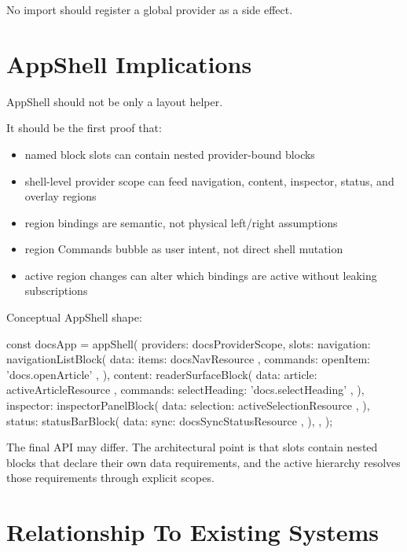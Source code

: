 No import should register a global provider as a side effect.

\section{AppShell Implications}\label{record-132-appshell-implications}

AppShell should not be only a layout helper.

It should be the first proof that:

\begin{itemize}
\tightlist
\item
  named block slots can contain nested provider-bound blocks
\item
  shell-level provider scope can feed navigation, content, inspector, status, and overlay regions
\item
  region bindings are semantic, not physical left/right assumptions
\item
  region Commands bubble as user intent, not direct shell mutation
\item
  active region changes can alter which bindings are active without leaking subscriptions
\end{itemize}

Conceptual AppShell shape:

\begin{CodeBlock}
const docsApp = appShell({
  providers: docsProviderScope,
  slots: {
    navigation: navigationListBlock({
      data: { items: docsNavResource },
      commands: { openItem: 'docs.openArticle' },
    }),
    content: readerSurfaceBlock({
      data: { article: activeArticleResource },
      commands: { selectHeading: 'docs.selectHeading' },
    }),
    inspector: inspectorPanelBlock({
      data: { selection: activeSelectionResource },
    }),
    status: statusBarBlock({
      data: { sync: docsSyncStatusResource },
    }),
  },
});
\end{CodeBlock}

The final API may differ. The architectural point is that slots contain nested blocks that declare their own data requirements, and the active hierarchy resolves those requirements through explicit scopes.

\section{Relationship To Existing Systems}\label{record-132-relationship-to-existing-systems}

